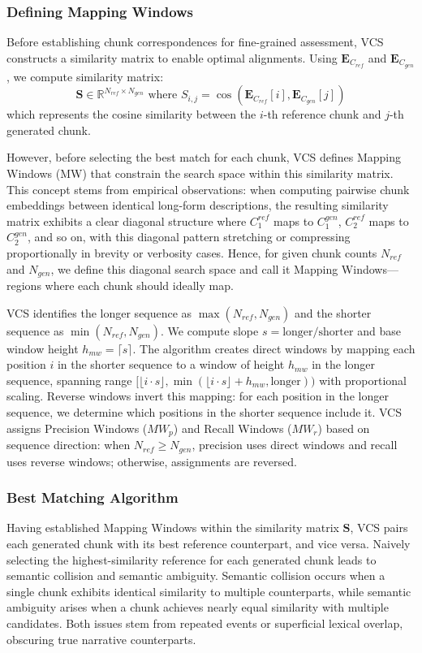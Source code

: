 \documentclass[main.tex]{subfiles}
\begin{document}
\subsubsection{Defining Mapping Windows}
Before establishing chunk correspondences for fine-grained assessment, VCS constructs a similarity matrix to enable optimal alignments. Using $\mathbf{E}_{C_{ref}}$ and $\mathbf{E}_{C_{gen}}$, we compute similarity matrix:
\begin{equation}
\mathbf{S} \in \mathbb{R}^{N_{ref} \times N_{gen}} \text{ where } S_{i,j} = \cos(\mathbf{E}_{C_{ref}}[i], \mathbf{E}_{C_{gen}}[j])
\end{equation}
which represents the cosine similarity between the $i$-th reference chunk and $j$-th generated chunk.

However, before selecting the best match for each chunk, VCS defines Mapping Windows (MW) that constrain the search space within this similarity matrix. This concept stems from empirical observations: when computing pairwise chunk embeddings between identical long-form descriptions, the resulting similarity matrix exhibits a clear diagonal structure where $C_1^{ref}$ maps to $C_1^{gen}$, $C_2^{ref}$ maps to $C_2^{gen}$, and so on, with this diagonal pattern stretching or compressing proportionally in brevity or verbosity cases. Hence, for given chunk counts $N_{ref}$ and $N_{gen}$, we define this diagonal search space and call it Mapping Windows—regions where each chunk should ideally map.

VCS identifies the longer sequence as $\max(N_{ref}, N_{gen})$ and the shorter sequence as $\min(N_{ref}, N_{gen})$. We compute slope $s = \text{longer}/\text{shorter}$ and base window height $h_{mw} = \lceil s \rceil$. The algorithm creates direct windows by mapping each position $i$ in the shorter sequence to a window of height $h_{mw}$ in the longer sequence, spanning range $[\lfloor i \cdot s \rfloor, \min(\lfloor i \cdot s \rfloor + h_{mw}, \text{longer}))$ with proportional scaling. Reverse windows invert this mapping: for each position in the longer sequence, we determine which positions in the shorter sequence include it. VCS assigns Precision Windows ($MW_p$) and Recall Windows ($MW_r$) based on sequence direction: when $N_{ref} \geq N_{gen}$, precision uses direct windows and recall uses reverse windows; otherwise, assignments are reversed.

\subsubsection{Best Matching Algorithm}
Having established Mapping Windows within the similarity matrix $\mathbf{S}$, VCS pairs each generated chunk with its best reference counterpart, and vice versa. Naively selecting the highest-similarity reference for each generated chunk leads to semantic collision and semantic ambiguity. Semantic collision occurs when a single chunk exhibits identical similarity to multiple counterparts, while semantic ambiguity arises when a chunk achieves nearly equal similarity with multiple candidates. Both issues stem from repeated events or superficial lexical overlap, obscuring true narrative counterparts.
\end{document}
